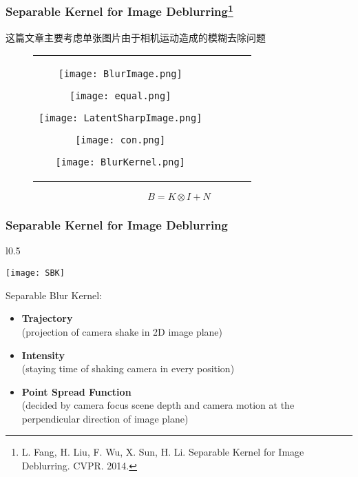 \documentclass[notheorems,mathserif,table,compress]{beamer}  %
\begin{document}
\begin{frame}
\frametitle{Separable Kernel for Image Deblurring\footnote{L. Fang, H. Liu, F. Wu, X. Sun, H. Li. Separable Kernel for Image Deblurring. CVPR. 2014.}}
这篇文章主要考虑单张图片由于相机运动造成的模糊去除问题
\begin{figure}[t]
    \begin{tabular}{ccccc}
    \begin{minipage}[t]{1in}
    \texttt{[image: BlurImage.png]}
    \end{minipage}
    \begin{minipage}[t]{0.1in}
    \texttt{[image: equal.png]}
    \end{minipage}

    \begin{minipage}[t]{1in}
    \texttt{[image: LatentSharpImage.png]}
    \end{minipage}
    \begin{minipage}[t]{0.1in}
    \texttt{[image: con.png]}
    \end{minipage}
    \begin{minipage}[t]{1in}
    \texttt{[image: BlurKernel.png]}
    \end{minipage}
\end{tabular}
\end{figure}

\begin{equation}
B=K\otimes I+N
\end{equation}
\end{frame}


\begin{frame}
\frametitle{Separable Kernel for Image Deblurring}
\begin{wrapfigure}{l}{0.5\textwidth}
  \vspace{-10pt}
  \begin{center}
    \texttt{[image: SBK]}
  \end{center}
  \vspace{-20pt}
  \vspace{-10pt}
\end{wrapfigure}
Separable Blur Kernel:
\begin{itemize}
\item \textbf{Trajectory}\\(projection of camera shake in 2D image plane)
\item \textbf{Intensity}\\(staying time of shaking camera in every position)
\item \textbf{Point Spread Function}\\(decided by camera focus scene depth and camera motion at the perpendicular direction of image plane)
\end{itemize}
\end{frame}
\end{document}
